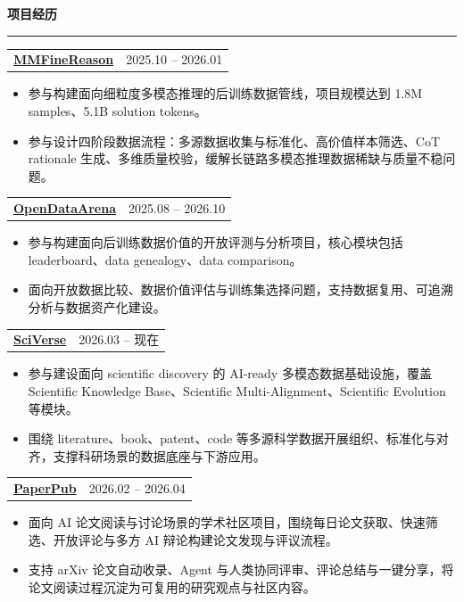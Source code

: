 \documentclass[UTF8]{ctexart}
\makeatletter
\newcommand{\cvsection}[1]{%
  \vspace{0.35em}
  {\zihao{-3}\bfseries #1\par}
  \vspace{0.1em}
  {\color{cvrule}\hrule height 0.8pt}
  \vspace{0.36em}
}
\newcommand{\cventryone}[2]{%
  \begin{tabularx}{\textwidth}{@{}Xr@{}}
    \textbf{#1} & #2
  \end{tabularx}\par
}
\newcommand{\projectlink}[2]{\href{#1}{\textcolor{cvlink}{#2}}}
\newcommand{\skillrow}[2]{\textbf{#1}：#2\par}
\makeatother
\begin{document}
\cvsection{项目经历}
\cventryone{\projectlink{https://mmfinereason.github.io/}{MMFineReason}}{2025.10 -- 2026.01}
\begin{itemize}[leftmargin=1.2em,itemsep=0.1em,topsep=1pt]
  \item 参与构建面向细粒度多模态推理的后训练数据管线，项目规模达到 1.8M samples、5.1B solution tokens。
  \item 参与设计四阶段数据流程：多源数据收集与标准化、高价值样本筛选、CoT rationale 生成、多维质量校验，缓解长链路多模态推理数据稀缺与质量不稳问题。
\end{itemize}
\vspace{-0.2em}
\cventryone{\projectlink{https://arena.opendatalab.org.cn/}{OpenDataArena}}{2025.08 -- 2026.10}
\begin{itemize}[leftmargin=1.2em,itemsep=0.1em,topsep=1pt]
  \item 参与构建面向后训练数据价值的开放评测与分析项目，核心模块包括 leaderboard、data genealogy、data comparison。
  \item 面向开放数据比较、数据价值评估与训练集选择问题，支持数据复用、可追溯分析与数据资产化建设。
\end{itemize}
\vspace{-0.2em}
\cventryone{\projectlink{https://sciverse.opendatalab.com/}{SciVerse}}{2026.03 -- 现在}
\begin{itemize}[leftmargin=1.2em,itemsep=0.1em,topsep=1pt]
  \item 参与建设面向 scientific discovery 的 AI-ready 多模态数据基础设施，覆盖 Scientific Knowledge Base、Scientific Multi-Alignment、Scientific Evolution 等模块。
  \item 围绕 literature、book、patent、code 等多源科学数据开展组织、标准化与对齐，支撑科研场景的数据底座与下游应用。
\end{itemize}
\vspace{-0.2em}
\cventryone{\projectlink{https://paperpub.opendatalab.com/}{PaperPub}}{2026.02 -- 2026.04}
\begin{itemize}[leftmargin=1.2em,itemsep=0.1em,topsep=1pt]
  \item 面向 AI 论文阅读与讨论场景的学术社区项目，围绕每日论文获取、快速筛选、开放评论与多方 AI 辩论构建论文发现与评议流程。
  \item 支持 arXiv 论文自动收录、Agent 与人类协同评审、评论总结与一键分享，将论文阅读过程沉淀为可复用的研究观点与社区内容。
\end{itemize}

\end{document}
